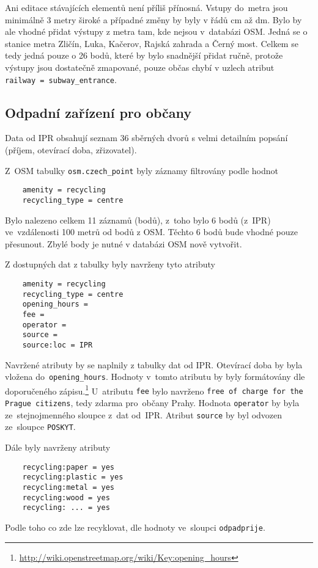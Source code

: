 Ani editace stávajících elementů není příliš přínosná. Vstupy
do~metra jsou minimálně 3 metry široké a případné změny by byly v řádů
cm až dm. Bylo by ale vhodné přidat výstupy z metra tam, kde nejsou
v~databázi OSM. Jedná se o stanice metra Zličín, Luka, Kačerov, Rajská
zahrada a Černý most. Celkem se tedy jedná pouze o 26 bodů, které by
bylo snadnější přidat ručně, protože výstupy jsou dostatečně zmapované,
pouze občas chybí v uzlech atribut {\tt railway~=~subway\_entrance}.


\subsection{Odpadní zařízení pro občany}
\label{Odpadní zařízení pro občany}
Data od IPR obsahují seznam 36 sběrných dvorů s velmi detailním
popsání (příjem, otevírací doba, zřizovatel). 

Z~OSM tabulky {\tt osm.czech\_point} byly záznamy filtrovány podle
hodnot
\begin{verbatim}
    amenity = recycling
    recycling_type = centre
\end{verbatim}    
Bylo nalezeno celkem 11 záznamů (bodů), z~toho bylo 6 bodů (z~IPR)
ve~vzdálenosti 100 metrů od bodů z OSM. Těchto 6 bodů bude vhodné
pouze přesunout. Zbylé body je nutné v databázi OSM nově vytvořit.

Z dostupných dat z tabulky byly navrženy tyto atributy
\begin{verbatim}
    amenity = recycling
    recycling_type = centre
    opening_hours =
    fee =
    operator =
    source =
    source:loc = IPR
\end{verbatim}
Navržené atributy by se naplnily z tabulky dat od IPR. Otevírací doba
by byla vložena do~{\tt opening\_hours}. Hodnoty v~tomto atributu
by byly formátovány dle doporučeného zápisu.\footnote{\url{http://wiki.openstreetmap.org/wiki/Key:opening\_hours}}
U~atributu {\tt fee} bylo navrženo {\tt free of charge for the Prague citizens}, tedy zdarma pro~občany Prahy. Hodnota
{\tt operator} by byla ze~stejnojmenného sloupce z~dat od~IPR. 
Atribut {\tt source} by byl odvozen ze~sloupce {\tt POSKYT}.

Dále byly navrženy atributy
\begin{verbatim}
    recycling:paper = yes
    recycling:plastic = yes
    recycling:metal = yes
    recycling:wood = yes
    recycling: ... = yes
\end{verbatim}
Podle toho co zde lze recyklovat, dle hodnoty ve~sloupci
{\tt odpadprije}.


